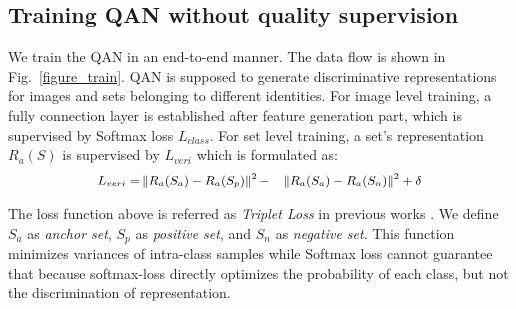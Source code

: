 \documentclass[10pt,twocolumn,letterpaper]{article}
\begin{document}
\subsection{Training QAN without quality supervision}
\label{end2endtrain}
We train the QAN in an end-to-end manner. The data flow is shown in Fig.~\ref{figure_train}. QAN is supposed to generate discriminative representations for images and sets belonging to different identities. For image level training, a fully connection layer is established after feature generation part, which is supervised by Softmax loss $L_{class}$. For set level training, a set's representation $R_a(S)$ is supervised by $L_{veri}$ which is formulated as:
\begin{equation}
\small
\begin{aligned}
\label{7}
L_{veri} = &\left \lVert R_a(S_a)-R_a(S_p) \right \rVert^2 - &\left \lVert R_a(S_a)- R_a(S_n) \right \rVert^2 + \delta
\end{aligned}
\end{equation}


The loss function above is referred as \emph{Triplet Loss} in previous works \cite{schroff2015facenet}. We define $S_a$ as \emph{anchor set}, $S_p$ as \emph{positive set}, and $S_n$ as \emph{negative set}.  This function minimizes variances of intra-class samples while Softmax loss cannot guarantee that because softmax-loss directly optimizes the probability of each class, but not the discrimination of representation.
\end{document}
